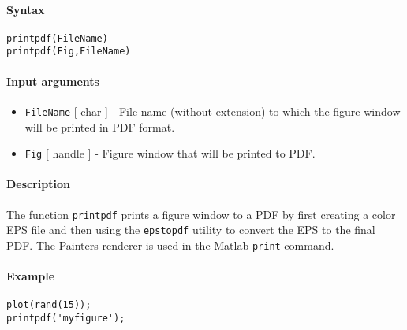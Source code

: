 


	\paragraph{Syntax}\label{syntax}

\begin{verbatim}
printpdf(FileName)
printpdf(Fig,FileName)
\end{verbatim}

\paragraph{Input arguments}\label{input-arguments}

\begin{itemize}
\item
  \texttt{FileName} {[} char {]} - File name (without extension) to
  which the figure window will be printed in PDF format.
\item
  \texttt{Fig} {[} handle {]} - Figure window that will be printed to
  PDF.
\end{itemize}

\paragraph{Description}\label{description}

The function \texttt{printpdf} prints a figure window to a PDF by first
creating a color EPS file and then using the \texttt{epstopdf} utility
to convert the EPS to the final PDF. The Painters renderer is used in
the Matlab \texttt{print} command.

\paragraph{Example}\label{example}

\begin{verbatim}
plot(rand(15));
printpdf('myfigure');
\end{verbatim}


